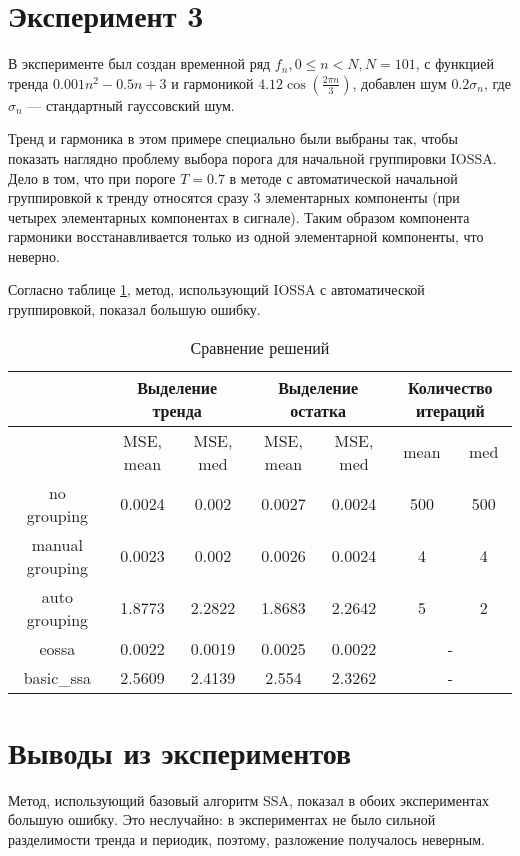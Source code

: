 \documentclass[specialist, substylefile = spbureport.rtx, subf,href,colorlinks=true, 12pt]{disser}
\theoremstyle{definition}
\begin{document}
\section{Эксперимент 3}
\label{exp3}

В эксперименте был создан временной ряд $f_n , 0\leq n < N, N=101$, с функцией тренда $0.001n^2 - 0.5n + 3$ и гармоникой $4.12\cos(\frac{2 \pi n} { 3})$,  добавлен шум $0.2 \sigma_n$, где $\sigma_n$ --- стандартный гауссовский шум.

Тренд и гармоника в этом примере специально были выбраны так, чтобы показать наглядно проблему выбора порога для начальной группировки IOSSA. Дело в том, что при пороге $T = 0.7$ в методе с автоматической начальной группировкой к тренду относятся сразу $3$ элементарных компоненты (при четырех элементарных компонентах в сигнале). Таким образом компонента гармоники восстанавливается только из одной элементарной компоненты, что неверно.

Согласно таблице \ref{tabular:3}, метод, использующий IOSSA с автоматической группировкой, показал большую ошибку.

\begin{table}[H]
\footnotesize
\caption{Сравнение решений}
\label{tabular:3}
\begin{center}
\begin{tabular}{|c | c| c| c| c| c| c|}
\hline
 \multirow{2}{}{}& \multicolumn{2}{c|}{Выделение тренда} & \multicolumn{2}{c|}{Выделение остатка} & \multicolumn{2}{c|}{Количество итераций} \\
 \hline
 & MSE, mean & MSE, med & MSE, mean & MSE, med & mean & med  \\
\hline
no grouping &  0.0024 & 0.002 & 0.0027 & 0.0024 & 500 & 500 \\
manual grouping & 0.0023 & 0.002 & 0.0026 & 0.0024 & 4 & 4 \\
auto grouping &  1.8773 & 2.2822 & 1.8683 & 2.2642 & 5 & 2\\
\hline
eossa &  0.0022 & 0.0019 & 0.0025 & 0.0022 & \multicolumn{2}{c|}{-} \\
basic\_ssa &  2.5609 & 2.4139 & 2.554 & 2.3262 & \multicolumn{2}{c|}{-} \\
\hline
\end{tabular}
\end{center}
\end{table}


\section{Выводы из экспериментов}
Метод, использующий базовый алгоритм SSA, показал в обоих экспериментах большую ошибку. Это неслучайно: в экспериментах не было сильной разделимости тренда и периодик, поэтому, разложение получалось неверным.
\end{document}
